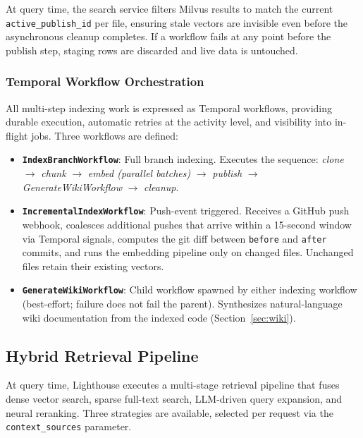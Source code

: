 \documentclass[a4paper,12pt]{article}
\begin{document}
At query time, the search service filters Milvus results to match the current
\texttt{active\_publish\_id} per file, ensuring stale vectors are invisible
even before the asynchronous cleanup completes.
If a workflow fails at any point before the publish step, staging rows are
discarded and live data is untouched.

\subsubsection{Temporal Workflow Orchestration}

All multi-step indexing work is expressed as Temporal workflows, providing
durable execution, automatic retries at the activity level, and visibility
into in-flight jobs.
Three workflows are defined:

\begin{itemize}[noitemsep]
  \item \textbf{\texttt{IndexBranchWorkflow}}: Full branch indexing.
    Executes the sequence: \textit{clone} $\to$ \textit{chunk} $\to$
    \textit{embed (parallel batches)} $\to$ \textit{publish} $\to$
    \textit{GenerateWikiWorkflow} $\to$ \textit{cleanup}.
  \item \textbf{\texttt{IncrementalIndexWorkflow}}: Push-event triggered.
    Receives a GitHub push webhook, coalesces additional pushes that arrive
    within a 15-second window via Temporal signals, computes the git diff
    between \texttt{before} and \texttt{after} commits, and runs the
    embedding pipeline only on changed files.
    Unchanged files retain their existing vectors.
  \item \textbf{\texttt{GenerateWikiWorkflow}}: Child workflow spawned by
    either indexing workflow (best-effort; failure does not fail the parent).
    Synthesizes natural-language wiki documentation from the indexed code
    (Section~\ref{sec:wiki}).
\end{itemize}

\subsection{Hybrid Retrieval Pipeline}

At query time, Lighthouse executes a multi-stage retrieval pipeline that fuses
dense vector search, sparse full-text search, LLM-driven query expansion, and
neural reranking.
Three strategies are available, selected per request via the
\texttt{context\_sources} parameter.
\end{document}
